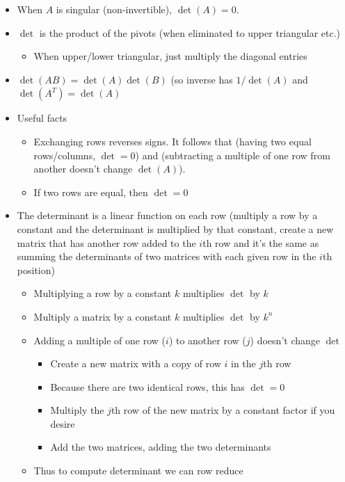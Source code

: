 \documentclass[12pt]{article} %
\begin{document}
\newpage
{}
\begin{itemize}[topsep=-1pt, itemsep=-1pt]
    \item When $A$ is singular (non-invertible), $\det(A) = 0$.    
    \item $\det$ is the product of the pivots (when eliminated to upper triangular etc.)
    \begin{itemize}[topsep=-1pt,itemsep=-1pt]
            \item When upper/lower triangular, just multiply the diagonal entries
    \end{itemize}
    \item $\det(AB) = \det(A)\det(B)$ (so inverse has $1/\det(A)$ and $\det(A^T) = \det(A)$
    \item Useful facts
    \begin{itemize}[topsep=-1pt,itemsep=-1pt]
            \item Exchanging rows reverses signs. It follows that (having two equal rows/columns, $\det = 0$) and (subtracting a multiple of one row from another doesn't change $\det(A)$).
            \item If two rows are equal, then $\det = 0$
    \end{itemize}    
    \item The determinant is a linear function on each row (multiply a row by a constant and the determinant is multiplied by that constant, create a new matrix that has another row added to the $i$th row and it's the same as summing the determinants of two matrices with each given row in the $i$th position)
    \begin{itemize}[topsep=-1pt,itemsep=-1pt]
            \item Multiplying a row by a constant $k$ multiplies $\det$ by $k$
            \item Multiply a matrix by a constant $k$ multiplies $\det$ by $k^n$
            \item Adding a multiple of one row ($i$) to another row ($j$) doesn't change $\det$
            \begin{itemize}[topsep=-1pt,itemsep=-1pt]
                \item Create a new matrix with a copy of row $i$ in the $j$th row
                \item Because there are two identical rows, this has $\det = 0$
                \item Multiply the $j$th row of the new matrix by a constant factor if you desire
                \item Add the two matrices, adding the two determinants
            \end{itemize}
            \item Thus to compute determinant we can row reduce
    \end{itemize}
\end{itemize}
\end{document}
